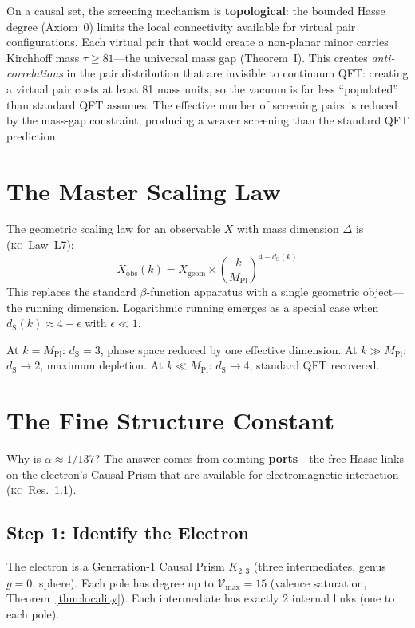\documentclass[11pt, a4paper, openany]{book}
\newcommand{\dS}{d_{\mathrm{S}}}
\newcommand{\MPl}{M_{\mathrm{Pl}}}
\newcommand{\KC}[1]{\textnormal{(\textsc{kc}~#1)}}
\newcounter{thm}[chapter]
\begin{document}
On a causal set, the screening mechanism is \textbf{topological}: the
bounded Hasse degree (Axiom~0) limits the local connectivity available
for virtual pair configurations. Each virtual pair that would create a
non-planar minor carries Kirchhoff mass $\tau \geq 81$---the universal
mass gap (Theorem~I).  This creates \emph{anti-correlations} in the pair
distribution that are invisible to continuum QFT: creating a virtual
pair costs at least 81 mass units, so the vacuum is far less
``populated'' than standard QFT assumes.  The effective number of
screening pairs is reduced by the mass-gap constraint, producing a
weaker screening than the standard QFT prediction.

\section{The Master Scaling Law}

The geometric scaling law for an observable $X$ with mass dimension
$\Delta$ is \KC{Law~L7}:
\begin{equation}\label{eq:master-scaling}
  \boxed{
    X_{\mathrm{obs}}(k) = X_{\mathrm{geom}} \times
    \left(\frac{k}{\MPl}\right)^{4 - \dS(k)}
  }
\end{equation}
This replaces the standard $\beta$-function apparatus with a single
geometric object---the running dimension. Logarithmic running emerges as
a special case when $\dS(k) \approx 4 - \epsilon$ with $\epsilon \ll 1$.

At $k = \MPl$: $\dS = 3$, phase space reduced by one effective dimension.
At $k \gg \MPl$: $\dS \to 2$, maximum depletion.
At $k \ll \MPl$: $\dS \to 4$, standard QFT recovered.

\section{The Fine Structure Constant}\label{sec:alpha}

Why is $\alpha \approx 1/137$? The answer comes from counting
\textbf{ports}---the free Hasse links on the electron's Causal Prism
that are available for electromagnetic interaction \KC{Res.~1.1}.

\subsection{Step 1: Identify the Electron}

The electron is a Generation-1 Causal Prism $K_{2,3}$ (three
intermediates, genus $g = 0$, sphere). Each pole has degree up to
$\mathcal{V}_{\max} = 15$ (valence saturation,
Theorem~\ref{thm:locality}). Each intermediate has exactly 2 internal
links (one to each pole).
\end{document}
